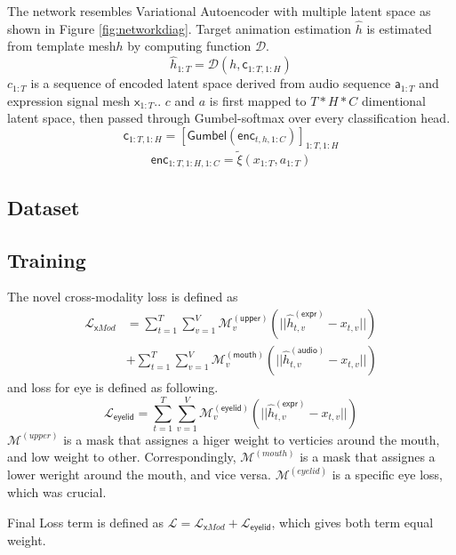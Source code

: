 \documentclass[10pt,twocolumn,letterpaper]{article}
\begin{document}
      The network resembles Variational Autoencoder with multiple latent space as shown in Figure \ref{fig:networkdiag}.
      Target animation estimation \(\hat{h}\) is estimated from template mesh\(h\) by computing function \(\mathcal{D}\).
      \begin{equation}
        \hat{h}_{1:T} = \mathcal{D}(h, \mathsf{c}_{1:T, 1:H})
        \label{eq:1}
      \end{equation}
      \(c_{1:T}\) is a sequence of encoded latent space derived from audio sequence \(\mathsf{a}_{1:T}\) and expression signal mesh \(\mathsf{x}_{1:T}\)..
      \(c\) and \(a\) is first mapped to \(T*H*C\) dimentional latent space, then passed through Gumbel-softmax \cite{jang2017categorical} over every classification head.
      \begin{equation}
        \mathsf{c}_{1:T, 1:H} = [\mathsf{Gumbel}(\mathsf{enc}_{t,h,1:C})]_{1:T, 1:H}
      \end{equation}
      \begin{equation}
        \mathsf{enc}_{1:T,1:H,1:C} = \tilde{\xi}(x_{1:T}, a_{1:T}) 
      \end{equation}
      
    \subsection{Dataset}
    \subsection{Training}
    The novel cross-modality loss is defined as
    \begin{equation}
      \begin{split}
        \mathcal{L}_{\mathsf{x}Mod} &= 
          \sum_{t=1}^{T}
          \sum_{v=1}^{V}
          \mathcal{M}_v^{\mathsf{(upper)}}
          (||\hat{h}_{t,v}^{\mathsf{(expr)}} - x_{t,v}||)\\
          &+
          \sum_{t=1}^{T}
          \sum_{v=1}^{V}
          \mathcal{M}_v^{\mathsf{(mouth)}}
          (||\hat{h}_{t,v}^{\mathsf{(audio)}} - x_{t,v}||)  
      \end{split}
    \end{equation}
    and loss for eye is defined as following.
    \begin{equation}
        \mathcal{L}_{\mathsf{eyelid}} = 
          \sum_{t=1}^{T}
          \sum_{v=1}^{V}
          \mathcal{M}_v^{\mathsf{(eyelid)}}
          (||\hat{h}_{t,v}^{\mathsf{(expr)}} - x_{t,v}||)
    \end{equation}
    \(\mathcal{M}^{(upper)}\) is a mask that assignes a higer weight to verticies around the mouth, and low weight to other.
    Correspondingly, \(\mathcal{M}^{(mouth)}\) is a mask that assignes a lower weright around the mouth, and vice versa.
    \(\mathcal{M}^{(eyelid)}\) is a specific eye loss, which was crucial.
    
    Final Loss term is defined as \(\mathcal{L} =\mathcal{L}_{\mathsf{x}Mod}+\mathcal{L}_{\mathsf{eyelid}} \), which gives both term equal weight.



{
  \small
  
  
}
\end{document}
